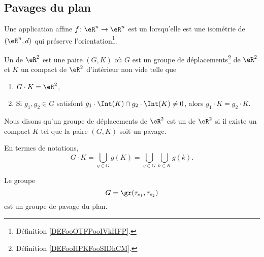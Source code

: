 
\subsection{Pavages du plan}

\begin{definition}      \label{DEFooHPKFooSIDhCM}
    Une application affine \( f\colon \eR^n\to \eR^n\) est un  lorsqu'elle est une isométrie de \( (\eR^n,d)\) qui préserve l'orientation\footnote{Définition \ref{DEFooOTFPooIVkHFP}.}.
\end{definition}

\begin{definition}      \label{DEFooJPHKooRgCBJs}
    Un  de \( \eR^2\) est une paire \( (G,K)\) où \( G\) est un groupe de déplacements\footnote{Définition \ref{DEFooHPKFooSIDhCM}.} de \( \eR^2\) et \( K\) un compact de \( \eR^2\) d'intérieur non vide telle que
    \begin{enumerate}
        \item
            \( G\cdot K=\eR^2\),
        \item       \label{ITEMooOIJZooZMKLUm}
            Si \( g_1,g_2\in G\) satisfont \( g_1\cdot \Int(K)\cap g_2\cdot\Int(K)\neq 0\), alors \( g_1\cdot K=g_2\cdot K\).
    \end{enumerate}
    Nous disons qu'un groupe de déplacements de \( \eR^2\) est un  de \( \eR^2\) si il existe un compact \( K\) tel que la paire \( (G,K)\) soit un pavage.
\end{definition}

En termes de notations,
\begin{equation}
    G\cdot K=\bigcup_{g\in G}g(K)=\bigcup_{g\in G}\bigcup_{k\in K}g(k).
\end{equation}

\begin{lemma}      
    Le groupe 
    \begin{equation}
        G=\gr(\tau_{e_1}, \tau_{e_2})
    \end{equation}
    est un groupe de pavage du plan.
\end{lemma}

